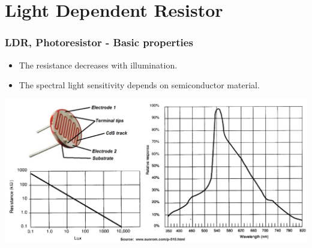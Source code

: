 \documentclass{beamer}
\begin{document}
\section{\texorpdfstring{Light Dependent Resistor}{Light Dependent Resistor}}
	\begin{frame}
    \frametitle{LDR, Photoresistor - Basic properties}
		\small
		\begin{itemize}
		\item The resistance decreases with illumination.
		\item The spectral light sensitivity depends on semiconductor material.
		\end{itemize}
		\includegraphics[scale=0.22]{obr01_fotoodpor.png}
	\end{frame}
\end{document}
